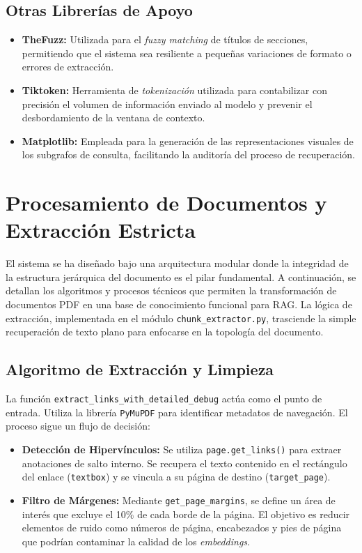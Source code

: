 \subsection{Otras Librerías de Apoyo}
\begin{itemize}
    \item \textbf{TheFuzz:} Utilizada para el \textit{fuzzy matching} de títulos de secciones, permitiendo que el sistema sea resiliente a pequeñas variaciones de formato o errores de extracción.
    \item \textbf{Tiktoken:} Herramienta de \textit{tokenización} utilizada para contabilizar con precisión el volumen de información enviado al modelo y prevenir el desbordamiento de la ventana de contexto.
    \item \textbf{Matplotlib:} Empleada para la generación de las representaciones visuales de los subgrafos de consulta, facilitando la auditoría del proceso de recuperación.
\end{itemize}

\newpage
\section{Procesamiento de Documentos y Extracción Estricta}
El sistema se ha diseñado bajo una arquitectura modular donde la integridad de la estructura jerárquica del documento es el pilar fundamental. A continuación, se detallan los algoritmos y procesos técnicos que permiten la transformación de documentos PDF en una base de conocimiento funcional para RAG.
La lógica de extracción, implementada en el módulo \texttt{chunk\_extractor.py}, trasciende la simple recuperación de texto plano para enfocarse en la topología del documento.

\subsection{Algoritmo de Extracción y Limpieza}
La función \texttt{extract\_links\_with\_detailed\_debug} actúa como el punto de entrada. Utiliza la librería \texttt{PyMuPDF} para identificar metadatos de navegación. El proceso sigue un flujo de decisión:
\begin{itemize}
    \item \textbf{Detección de Hipervínculos:} Se utiliza \texttt{page.get\_links()} para extraer anotaciones de salto interno. Se recupera el texto contenido en el rectángulo del enlace (\texttt{textbox}) y se vincula a su página de destino (\texttt{target\_page}).
    \item \textbf{Filtro de Márgenes:} Mediante \texttt{get\_page\_margins}, se define un área de interés que excluye el 10\% de cada borde de la página. El objetivo es reducir elementos de ruido como números de página, encabezados y pies de página que podrían contaminar la calidad de los \textit{embeddings}.
\end{itemize}

